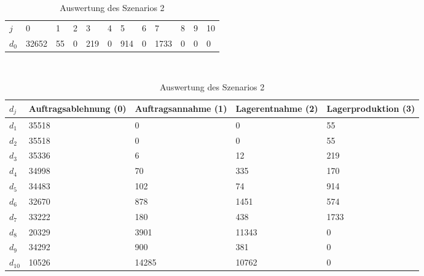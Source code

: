 \begin{table}[h!]
\renewcommand{\arraystretch}{1.5}
  \begin{center}
    \caption{Auswertung des Szenarios 2}  \label{AS2}
    \vspace*{3mm}
    \begin{tabular}{l l l l l l l l l l l l }  \hline 
         $j$ & 0 & 1  & 2 & 3 & 4  & 5 & 6 & 7 & 8 & 9 & 10  \\  
$d_{0}$ &  32652 &  55 &  0 &  219 &  0 &  914 &  0 &  1733 &  0 &  0 &  0 \\
\hline
    \end{tabular} \\[3mm]
        \begin{tabular}{ l p{2.5cm} p{2.5cm} p{2.5cm} p{2.5cm} }   \hline    %
    $d_j$ & Auftrags\-ablehnung (0) & Auftrags\-annahme (1)  & Lager\-entnahme (2) & Lager\-produktion (3)\\\hline 
$d_{1}$  &  35518 &    0 &    0 &    55 \\
$d_{2}$  &  35518 &    0 &    0 &    55 \\
$d_{3}$  &  35336 &      6 &     12 &   219 \\
$d_{4}$  &  34998 &     70 &    335 &   170 \\
$d_{5}$  &  34483 &    102 &     74 &   914 \\
$d_{6}$  &  32670 &    878 &   1451 &   574 \\
$d_{7}$  &  33222 &    180 &    438 &  1733 \\
$d_{8}$  &  20329 &   3901 &  11343 &   0 \\
$d_{9}$  &  34292 &    900 &    381 &   0 \\
$d_{10}$ &  10526 &  14285 &  10762 &   0 \\
          \hline
   \end{tabular} \\[3mm]
     \end{center}
\end{table}


